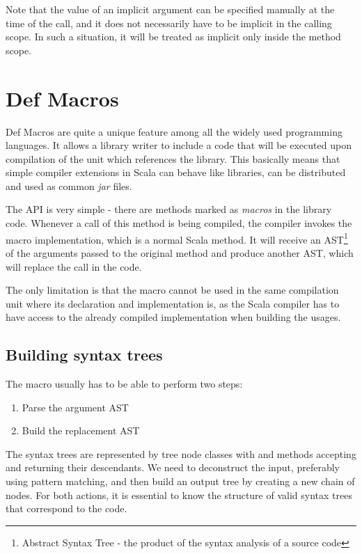 Note that the value of an implicit argument can be specified manually at the time of the call, and it does not necessarily have to be implicit in the calling scope. In such a situation, it will be treated as implicit only inside the method scope.

\section{Def Macros}
\label{sec:defmacros}

Def Macros are quite a unique feature among all the widely used programming languages. It allows a library writer to include a code that will be executed upon compilation of the unit which references the library. This basically means that simple compiler extensions in Scala can behave like libraries, can be distributed and used as common \textit{jar} files.

The API is very simple - there are methods marked as \textit{macros} in the library code. Whenever a call of this method is being compiled, the compiler invokes the macro implementation, which is a normal Scala method. It will receive an AST\footnote{Abstract Syntax Tree - the product of the syntax analysis of a source code} of the arguments passed to the original method and produce another AST, which will replace the call in the code.


The only limitation is that the macro cannot be used in the same compilation unit where its declaration and implementation is, as the Scala compiler has to have access to the already compiled implementation when building the usages.

\subsection{Building syntax trees}
\label{subsec:buildingast}

The macro usually has to be able to perform two steps:

\begin{enumerate}
	\item Parse the argument AST
	\item Build the replacement AST
\end{enumerate}

The syntax trees are represented by tree node classes with  and  methods accepting and returning their descendants. We need to deconstruct the input, preferably using pattern matching, and then build an output tree by creating a new chain of nodes. For both actions, it is essential to know the structure of valid syntax trees that correspond to the code.

